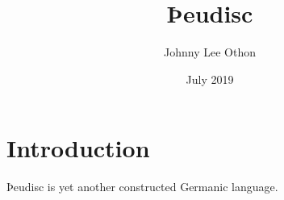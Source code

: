 \documentclass{article}
\title{Þeudisc}
\author{Johnny Lee Othon}
\date{July 2019}
\begin{document}
\maketitle

\section{Introduction}

Þeudisc is yet another constructed Germanic language.










\end{document}
